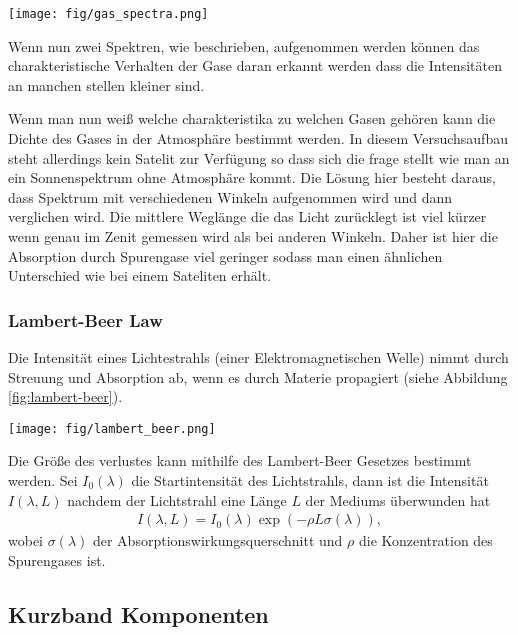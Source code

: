 \documentclass[12pt, a4paper, bibliography=totoc]{scrartcl}
\begin{document}
\begin{multicols}{2}
\begin{center}
    \texttt{[image: fig/gas\_spectra.png]}
    \label{fig:gas_spectra}
\end{center}

Wenn nun zwei Spektren, wie beschrieben, aufgenommen werden 
können das charakteristische Verhalten der Gase daran erkannt werden dass die Intensitäten an manchen stellen kleiner sind.

Wenn man nun weiß welche charakteristika zu welchen Gasen gehören kann die Dichte des Gases in der Atmosphäre bestimmt werden.
In diesem Versuchsaufbau steht allerdings kein Satelit zur Verfügung so dass sich die frage stellt wie man an ein Sonnenspektrum ohne Atmosphäre kommt.
Die Lösung hier besteht daraus, dass Spektrum mit verschiedenen Winkeln aufgenommen wird und dann verglichen wird.
Die mittlere Weglänge die das Licht zurücklegt ist viel kürzer wenn genau im Zenit gemessen wird als bei anderen Winkeln.
Daher ist hier die Absorption durch Spurengase viel geringer sodass man einen ähnlichen Unterschied wie bei einem Sateliten erhält.

\subsubsection{Lambert-Beer Law}
    Die Intensität eines Lichtestrahls (einer Elektromagnetischen Welle) nimmt durch Streuung und Absorption ab, wenn es durch Materie propagiert (siehe Abbildung \ref{fig:lambert-beer}).
\begin{center}
    \texttt{[image: fig/lambert\_beer.png]}
	\label{fig:lambert-beer}
\end{center}

Die Größe des verlustes kann mithilfe des Lambert-Beer Gesetzes bestimmt werden.
    Sei $I_0 (\lambda)$ die Startintensität des Lichtstrahls, dann ist die Intensität $I(\lambda, L)$ nachdem der Lichtstrahl eine Länge $L$ der Mediums überwunden hat
    \begin{align}
        I(\lambda, L) = I_0 (\lambda) \exp \left( - \rho L \sigma (\lambda)\right) ,
    \end{align}
    wobei $\sigma (\lambda)$ der Absorptionswirkungsquerschnitt und $\rho$ die Konzentration des Spurengases ist.

\subsection{Kurzband Komponenten}

\end{multicols}
\end{document}
